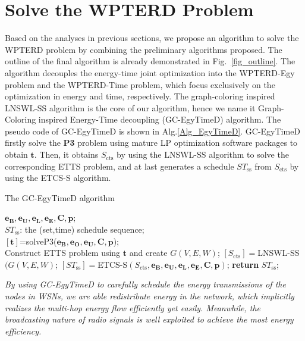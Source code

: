 \documentclass[12pt,journal,onecolumn,draftcls]{IEEEtran}
\begin{document}
\section{Solve the WPTERD Problem}
\label{sec_algcombin}
Based on the analyses in previous sections, we propose an algorithm to solve the WPTERD problem by combining the preliminary algorithms proposed. The outline of the final algorithm is already demonstrated in Fig.~\ref{fig_outline}. The algorithm decouples the energy-time joint optimization into the WPTERD-Egy problem and the WPTERD-Time problem, which focus exclusively on the optimization in energy and time, respectively. The graph-coloring inspired LNSWL-SS algorithm is the core of our algorithm, hence we name it Graph-Coloring inspired Energy-Time decoupling (GC-EgyTimeD) algorithm. The pseudo code of GC-EgyTimeD is shown in Alg.\ref{Alg_EgyTimeD}.  GC-EgyTimeD firstly solve the \textbf{P3} problem using mature LP optimization software packages to obtain $\mathbf{t}$. Then, it obtains $S_\text{cts}$ by using the LNSWL-SS algorithm to solve the corresponding ETTS problem, and at last generates a schedule $ST_\text{ss}$ from $S_\text{cts}$ by using the ETCS-S algorithm.

\begin{algorithm}[!htb]
\caption{The GC-EgyTimeD algorithm}
\begin{algorithmic}[1]\label{Alg_EgyTimeD}
    \REQUIRE $\mathbf{e_B}, \mathbf{e_U}, \mathbf{e_L}, \mathbf{e_E}, \mathbf{C}, \mathbf{p}$;\\
    \ENSURE $ST_\text{ss}$: the (set,time) schedule sequence;\\
    \STATE $[\mathbf{t}]${=}solveP3($\mathbf{e_B}, \mathbf{e_O},\mathbf{e_U},\mathbf{C}, \mathbf{p}$);\\
    \STATE Construct ETTS problem using $\mathbf{t}$ and create $G(V,E,W)$;
    \STATE $[S_\text{cts}]{=}$LNSWL-SS$(G(V,E,W)$;
    \STATE $[ST_\text{ss}]{=}$ETCS-S$(S_\text{cts},\mathbf{e_B}, \mathbf{e_U}, \mathbf{e_L}, \mathbf{e_E}, \mathbf{C}, \mathbf{p})$;
    \STATE \textbf{return} $ST_\text{ss}$;
\end{algorithmic}
\end{algorithm}

\textit{By using GC-EgyTimeD to carefully schedule the energy transmissions of the nodes in WSNs, we are able redistribute energy in the network, which implicitly realizes the multi-hop energy flow efficiently yet easily. Meanwhile, the broadcasting nature of radio signals is well exploited to achieve the most energy efficiency.}
\end{document}
